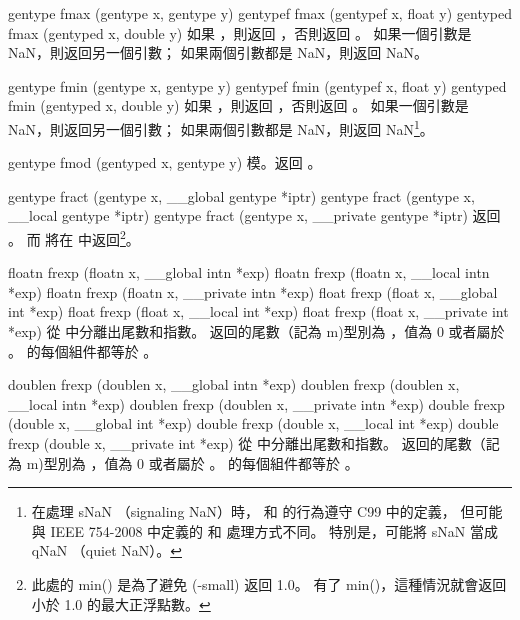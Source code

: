 gentype fmax (gentype x, gentype y)
gentypef fmax (gentypef x, float y)
gentyped fmax (gentyped x, double y)
\stopbuffer
{}
如果 ，則返回 ，否則返回 。
如果一個引數是 NaN，則返回另一個引數；
如果兩個引數都是 NaN，則返回 NaN。
\stopbuffer
\stopbuffer

gentype fmin (gentype x, gentype y)
gentypef fmin (gentypef x, float y)
gentyped fmin (gentyped x, double y)
\stopbuffer
{}
如果 ，則返回 ，否則返回 。
如果一個引數是 NaN，則返回另一個引數；
如果兩個引數都是 NaN，則返回 NaN\footnote{
在處理 sNaN （signaling NaN）時，  和  的行為遵守 C99 中的定義，
但可能與 IEEE 754-2008 中定義的  和  處理方式不同。
特別是，可能將 sNaN 當成 qNaN （quiet NaN）。}。
\stopbuffer

gentype fmod (gentyped x, gentype y)
\stopbuffer
{}
模。返回 。
\stopbuffer

gentype fract (gentype x,
	__global gentype *iptr)
gentype fract (gentype x,
	__local gentype *iptr)
gentype fract (gentype x,
	__private gentype *iptr)
\stopbuffer
{}
返回 。
而  將在  中返回\footnote{
此處的 min() 是為了避免 (-small) 返回 1.0。
有了 min()，這種情況就會返回小於 1.0 的最大正浮點數。}。
\stopbuffer

floatn frexp (floatn x,
	__global intn *exp)
floatn frexp (floatn x,
	__local intn *exp)
floatn frexp (floatn x,
	__private intn *exp)
float frexp (float x,
	__global int *exp)
float frexp (float x,
	__local int *exp)
float frexp (float x,
	__private int *exp)
\stopbuffer
{}
從  中分離出尾數和指數。
返回的尾數（記為 m)型別為 ，值為 0 或者屬於 \math{[1/2, 1)}。
 的每個組件都等於 。
\stopbuffer

doublen frexp (doublen x,
	__global intn *exp)
doublen frexp (doublen x,
	__local intn *exp)
doublen frexp (doublen x,
	__private intn *exp)
double frexp (double x,
	__global int *exp)
double frexp (double x,
	__local int *exp)
double frexp (double x,
	__private int *exp)
\stopbuffer
{}
從  中分離出尾數和指數。
返回的尾數（記為 m)型別為 ，值為 0 或者屬於 \math{[1/2, 1)}。
 的每個組件都等於 。
\stopbuffer

